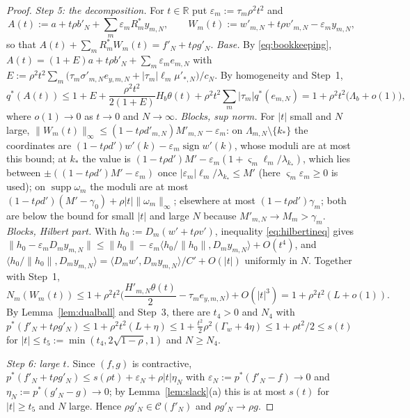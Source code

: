 \documentclass[10pt]{amsart}
\theoremstyle{definition}
\theoremstyle{remark}
\newcommand{\supp}{\operatorname{supp}}
\newcommand{\sgn}{\operatorname{sign}}
\newcommand{\R}{\mathbb R}
\newcommand{\Cset}{\mathcal C}
\newcommand{\ip}[2]{\langle #1,#2\rangle}
\begin{document}
\begin{proof}
\emph{Step 5: the decomposition.}  For $t\in\R$ put
$\varepsilon_m:=\tau_m\rho^2t^2$ and
\[
 A(t):=a+t\rho b'_N+\sum_m\varepsilon_mR_m^*y_{m,N},\qquad
 W_m(t):=w'_{m,N}+t\rho v'_{m,N}-\varepsilon_my_{m,N},
\]
so that $A(t)+\sum_mR_m^*W_m(t)=f'_N+t\rho g'_N$.
\emph{Base.}  By \eqref{eq:bookkeeping},
$A(t)=(1+E)a+t\rho b'_N+\sum_m\varepsilon_me_{m,N}$ with
$E:=\rho^2t^2\sum_m\big(\tau_m\sigma'_{m,N}e_{y,m,N}+|\tau_m|\ell_m
\mu'_{*,N}\big)/c_N$.  By homogeneity and Step~1,
\[
 q^*(A(t))\le1+E+\frac{\rho^2t^2}{2(1+E)}H_b\theta(t)
 +\rho^2t^2\sum_m|\tau_m|q^*(e_{m,N})
 =1+\rho^2t^2\big(\Lambda_b+o(1)\big),
\]
where $o(1)\to0$ as $t\to0$ and $N\to\infty$.
\emph{Blocks, sup norm.}  For $|t|$ small and $N$ large,
$\|W_m(t)\|_\infty\le(1-t\rho d'_{m,N})M'_{m,N}-\varepsilon_m$: on
$\Lambda_{m,N}\setminus\{k_*\}$ the coordinates are
$(1-t\rho d')w'(k)-\varepsilon_m\sgn w'(k)$, whose moduli are at most this
bound; at $k_*$ the value is $(1-t\rho d')M'-\varepsilon_m(1+\varsigma_m
\ell_m/\lambda_{k_*})$, which lies between $\pm((1-t\rho
d')M'-\varepsilon_m)$ once $|\varepsilon_m|\ell_m/\lambda_{k_*}\le M'$ (here
$\varsigma_m\varepsilon_m\ge0$ is used); on $\supp\omega_m$ the moduli are at
most $(1-t\rho d')(M'-\gamma_0)+\rho|t|\|\omega_m\|_\infty$; elsewhere at
most $(1-t\rho d')\gamma_m$; both are below the bound for small $|t|$ and
large $N$ because $M'_{m,N}\to M_m>\gamma_m$.
\emph{Blocks, Hilbert part.}  With $h_0:=D_m(w'+t\rho v')$, inequality
\eqref{eq:hilbertineq} gives
$\|h_0-\varepsilon_mD_my_{m,N}\|\le\|h_0\|-\varepsilon_m\ip{h_0/\|h_0\|}{D_m
y_{m,N}}+O(t^4)$, and $\ip{h_0/\|h_0\|}{D_my_{m,N}}=
\ip{D_mw'}{D_my_{m,N}}/C'+O(|t|)$ uniformly in $N$.  Together with Step~1,
\[
 N_m(W_m(t))\le1+\rho^2t^2\Big(\frac{H'_{m,N}\theta(t)}2-\tau_me_{y,m,N}
 \Big)+O(|t|^3)=1+\rho^2t^2(L+o(1)).
\]
By Lemma~\ref{lem:dualball} and Step~3, there are $t_4>0$ and $N_4$ with
$p^*(f'_N+t\rho g'_N)\le1+\rho^2t^2(L+\eta)\le1+\frac{t^2}2\rho^2
(\Gamma_w+4\eta)\le1+\rho t^2/2\le s(t)$ for $|t|\le t_5:=\min(t_4,
2\sqrt{1-\rho},1)$ and $N\ge N_4$.

\emph{Step 6: large $t$.}  Since $(f,g)$ is contractive,
$p^*(f'_N+t\rho g'_N)\le s(\rho t)+\varepsilon_N+\rho|t|\eta_N$ with
$\varepsilon_N:=p^*(f'_N-f)\to0$ and $\eta_N:=p^*(g'_N-g)\to0$; by
Lemma~\ref{lem:slack}(a) this is at most $s(t)$ for $|t|\ge t_5$ and $N$
large.  Hence $\rho g'_N\in\Cset(f'_N)$ and $\rho g'_N\to\rho g$.
\end{proof}
\end{document}
